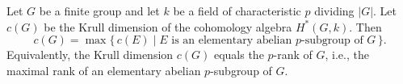 Let $G$ be a finite group and let $k$ be a field of characteristic $p$ dividing $|G|$. Let $c(G)$ be the Krull dimension of the cohomology algebra $H^*(G, k)$. Then
$$c(G) = \max \{\, c(E) \mid E \text{ is an elementary abelian } p\text{-subgroup of } G \,\}.$$
Equivalently, the Krull dimension $c(G)$ equals the $p$-rank of $G$, i.e., the maximal rank of an elementary abelian $p$-subgroup of $G$.
